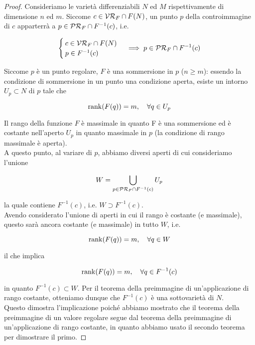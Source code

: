 \begin{proof}
	Consideriamo le varietà differenziabili $ N $ ed $ M $ rispettivamente di dimensione $ n $ ed $ m $. Siccome $ c \in \mathcal{VR}_{F} \cap F(N) $, un punto $ p $ della controimmagine di $ c $ apparterrà a $ p \in \mathcal{PR}_{F} \cap F^{-1}(c) $, i.e.
	
	\begin{equation}
		\begin{cases}
			c \in \VR_{F} \cap F(N) \\
			p \in F^{-1}(c)
		\end{cases} %
		\implies %
		p \in \PR_{F} \cap F^{-1}(c)
	\end{equation}
	
	Siccome $ p $ è un punto regolare, $ F $ è una sommersione in $ p $ ($ n \geqslant m $): essendo la condizione di sommersione in un punto una condizione aperta, esiste un intorno $ U_{p} \subset N $ di $ p $ tale che
	
	\begin{equation}
		\rank(F(q)) = m \qcomma \forall q \in U_{p}
	\end{equation}
	
	Il rango della funzione $ F $ è massimale in quanto F è una sommersione ed è costante nell'aperto $ U_{p} $ in quanto massimale in $ p $ (la condizione di rango massimale è aperta).\\
	A questo punto, al variare di $ p $, abbiamo diversi aperti di cui consideriamo l'unione
	
	\begin{equation}
		W = \bigcup_{p \in \mathcal{PR}_{F} \cap F^{-1}(c)} U_{p}
	\end{equation}
	
	la quale contiene $ F^{-1}(c) $, i.e. $ W \supset F^{-1}(c) $.\\
	Avendo considerato l'unione di aperti in cui il rango è costante (e massimale), questo sarà ancora costante (e massimale) in tutto $ W $, i.e.
	
	\begin{equation}
		\rank(F(q)) = m \qcomma \forall q \in W
	\end{equation}

	il che implica
	
	\begin{equation}
		\rank(F(q)) = m \qcomma \forall q \in F^{-1}(c)
	\end{equation}
	
	in quanto $ F^{-1}(c) \subset W $. Per il teorema della preimmagine di un'applicazione di rango costante, otteniamo dunque che $ F^{-1}(c) $ è una sottovarietà di $ N $.\\	
	Questo dimostra l'implicazione poiché abbiamo mostrato che il teorema della preimmagine di un valore regolare segue dal teorema della preimmagine di un'applicazione di rango costante, in quanto abbiamo usato il secondo teorema per dimostrare il primo.
\end{proof}

